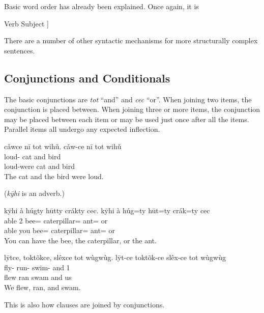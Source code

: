 Basic word order has already been explained.
Once again, it is
\begin{center}
    \quad Verb \quad Subject \quad [\quad Direct Object \quad  [ \quad Indirect Object \quad ] \quad ]
\end{center}
There are a number of other syntactic mechanisms for more structurally complex sentences.

\subsection{Conjunctions and Conditionals}\label{subsec:conjunctions-and-conditionals}

The basic conjunctions are \textit{tot} ``and''
and \textit{cec} ``or''.
When joining two items, the conjunction is placed between.
When joining three or more items,
the conjunction may be placed between each item
or may be used just once after all the items.
Parallel items all undergo any expected inflection.

\begin{exe}
    \ex
    \glt
    cǎwce nī tot wihǔ.
    \glll
    cǎw-ce nī tot wihǔ \\
    loud-\Pst{} cat and bird \\
    loud-were cat and bird \\
    \glt
    The cat and the bird were loud.
\end{exe}

(\textit{kȳhi} is an adverb.)
\begin{exe}
    \ex
    \glt
    kȳhi à húgty hūtty crákty cec.
    \glll
    kȳhi à húg=ty hūt=ty crák=ty cec \\
    able 2\Sg{} bee=\Poss{} caterpillar=\Poss{} ant=\Poss{} or \\
    able you bee=\Poss{} caterpillar=\Poss{} ant=\Poss{} or \\
    \glt
    You can have the bee, the caterpillar, or the ant.
\end{exe}

\begin{exe}
    \ex
    \glt
    lȳtce, toktõkce, slêxce tot wùgwùg.
    \glll
    lȳt-ce toktõk-ce slêx-ce tot wùgwùg \\
    fly-\Pst{} run-\Pst{} swim-\Pst{} and 1\Pl{} \\
    flew ran swam and us \\
    \glt
    We flew, ran, and swam.
\end{exe}

This is also how clauses are joined by conjunctions.

